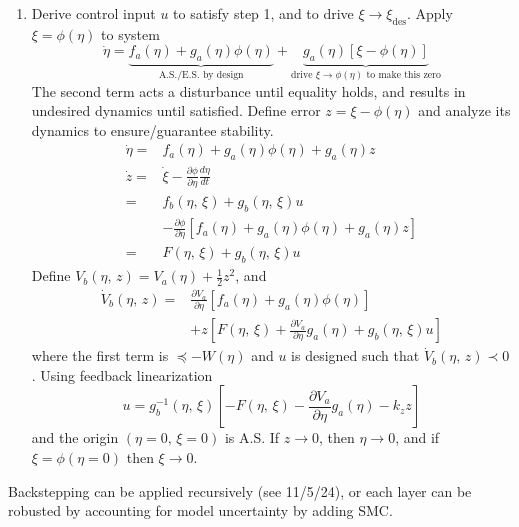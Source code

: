 \documentclass[twocolumn]{article}    %
\begin{document}
\begin{enumerate}
    \item Derive control input \(u\) to satisfy step 1, and to drive \(\xi \to \xi_{\text{des}}\). Apply \(\xi=\phi(\eta)\) to system
    \begin{equation*}
        \dot{\eta} = \underbrace{f_a(\eta) + g_a(\eta)\phi(\eta)}_{\text{A.S./E.S. by design}} +  \underbrace{g_a(\eta) [\xi -\phi(\eta)]}_{\text{drive } \xi \to \phi(\eta) \text{ to make this zero}}
    \end{equation*}
    The second  term acts a disturbance until equality holds, and results in undesired dynamics until satisfied. Define error \(z = \xi - \phi(\eta)\) and analyze its dynamics to ensure/guarantee stability.     
    \begin{align*}
        \dot{\eta} =& f_a(\eta) + g_a(\eta)\phi(\eta) + g_a(\eta)z\\
        \dot{z} =& \dot{\xi} - \frac{\partial \phi}{\partial \eta} \frac{d\eta}{dt}\\
        =& f_b(\eta,\, \xi) + g_b(\eta,\,\xi) u \\
        &-\frac{\partial \phi}{\partial \eta} \left[f_a(\eta) + g_a(\eta)\phi(\eta) + g_a(\eta)z \right]\\
        =& F(\eta,\,\xi) + g_b(\eta,\,\xi)u
    \end{align*}
    Define \(V_b(\eta,\,z) = V_a(\eta) + \frac{1}{2}z^2\), and 
    \begin{align*}
        \dot{V}_b(\eta,\,z)  =&  \frac{\partial V_a}{\partial \eta} \left[f_a(\eta) + g_a(\eta)\phi(\eta) \right]  \hspace{10pt}\\
        &+ z\left[ F(\eta,\,\xi) + \frac{\partial V_a}{\partial \eta} g_a(\eta) + g_b(\eta,\,\xi) u\right] 
    \end{align*}
    where the first term is \(\preceq -W(\eta)\) and \(u\) is designed such that \(\dot{V}_b(\eta,\,z) \prec 0\). Using feedback linearization
    \begin{equation*}
        u = g_b^{-1} (\eta,\,\xi) \left[- F(\eta,\,\xi) - \frac{\partial V_a}{\partial \eta} g_a(\eta) - k_zz \right]
    \end{equation*}
    and the origin \((\eta=0,\, \xi=0)\) is A.S. If \(z\to 0\), then \(\eta\to0\), and if \(\xi=\phi(\eta=0)\) then \(\xi\to0\). 
\end{enumerate}
Backstepping can be applied recursively (see 11/5/24), or each layer can be robusted by accounting for model uncertainty by adding SMC.
\end{document}
